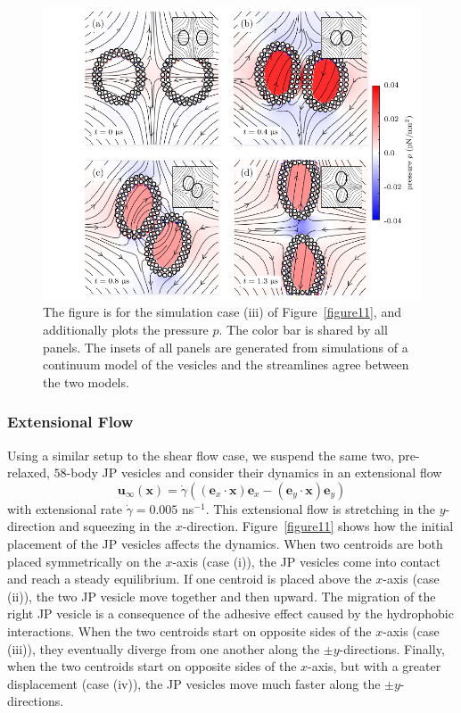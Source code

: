 \documentclass[lineno]{jfm}
\newcommand{\xx}{\mathbf{x}}
\newcommand{\uu}{\mathbf{u}}
\begin{document}
\begin{figure}
  \centering
  \includegraphics[width=\textwidth]{Figure12_Wrapper.pdf}
  \caption{\label{figure12} The figure is for the simulation case (iii) of Figure~\ref{figure11},
  and additionally plots the pressure $p$.  The color bar is shared by all panels. 
  The insets of all panels are generated from simulations of a continuum
  model of the vesicles and the streamlines agree between the two models.}
\end{figure}



\subsubsection{Extensional Flow}

Using a similar setup to the shear flow case, we suspend the same two,
pre-relaxed, $58$-body JP vesicles and consider their dynamics in an
extensional flow 
\begin{equation}
\uu_{\infty}(\xx) = \dot \gamma ((\mathbf{e}_x \cdot \xx)\mathbf{e}_x - (\mathbf{e}_y \cdot \xx)\mathbf{e}_y)
\end{equation}
with extensional rate $\dot \gamma =0.005$ ns$^{-1}$. This extensional
flow is stretching in the $y$-direction and squeezing in the
$x$-direction. Figure~\ref{figure11} shows how the initial placement of
the JP vesicles affects the dynamics. When two centroids are both placed
symmetrically on the $x$-axis (case (i)), the JP vesicles come into
contact and reach a steady equilibrium. If one centroid is placed above
the $x$-axis (case (ii)), the two JP vesicle move together and then
upward. The migration of the right JP vesicle is a consequence of the
adhesive effect caused by the hydrophobic interactions. When the two
centroids start on opposite sides of the $x$-axis (case (iii)), they
eventually diverge from one another along the $\pm y$-directions.
Finally, when the two centroids start on opposite sides of the $x$-axis,
but with a greater displacement (case (iv)), the JP vesicles move much
faster along the $\pm y$-directions.
\end{document}
